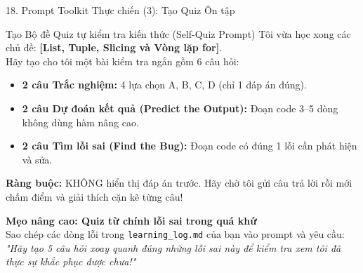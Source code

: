 \documentclass[aspectratio=169, 10pt]{beamer}
\begin{document}
\begin{frame}{18. Prompt Toolkit Thực chiến (3): Tạo Quiz Ôn tập}
  \begin{cbox}[primaryblue]{Tạo Bộ đề Quiz tự kiểm tra kiến thức (Self-Quiz Prompt)}
    \footnotesize
    Tôi vừa học xong các chủ đề: \textbf{[List, Tuple, Slicing và Vòng lặp for]}.\\[3pt]
    Hãy tạo cho tôi một bài kiểm tra ngắn gồm 6 câu hỏi:
    \begin{itemize}\setlength{\itemsep}{2pt}
      \item \textbf{2 câu Trắc nghiệm:} 4 lựa chọn A, B, C, D (chỉ 1 đáp án đúng).
      \item \textbf{2 câu Dự đoán kết quả (Predict the Output):} Đoạn code 3--5 dòng không dùng hàm nâng cao.
      \item \textbf{2 câu Tìm lỗi sai (Find the Bug):} Đoạn code có đúng 1 lỗi cần phát hiện và sửa.
    \end{itemize}
    \vspace{2pt}
    \textbf{Ràng buộc:} KHÔNG hiển thị đáp án trước. Hãy chờ tôi gửi câu trả lời rồi mới chấm điểm và giải thích cặn kẽ từng câu!
  \end{cbox}
  \vspace{0.15cm}
  \begin{tcolorbox}[colback=secondarygreen!8, colframe=secondarygreen, arc=3pt, left=8pt, right=8pt, top=3pt, bottom=3pt]
    \textbf{\footnotesize Mẹo nâng cao: Quiz từ chính lỗi sai trong quá khứ}\\
    \footnotesize Sao chép các dòng lỗi trong \texttt{learning\_log.md} của bạn vào prompt và yêu cầu: \textit{"Hãy tạo 5 câu hỏi xoay quanh đúng những lỗi sai này để kiểm tra xem tôi đã thực sự khắc phục được chưa!"}
  \end{tcolorbox}
\end{frame}
\end{document}
